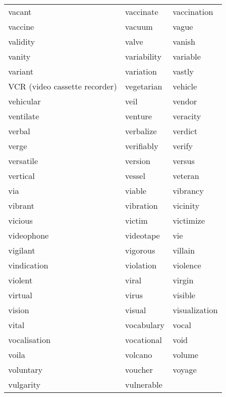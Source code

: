 \documentclass{minimal}
\begin{document}
\begin{longtable}{p{2.7cm}@{\hskip 0.2cm}p{2.7cm}@{\hskip 0.2cm}p{2.7cm}}
vacant & vaccinate & vaccination \\
vaccine & vacuum & vague \\
validity & valve & vanish \\
vanity & variability & variable \\
variant & variation & vastly \\
VCR (video cassette recorder) & vegetarian & vehicle \\
vehicular & veil & vendor \\
ventilate & venture & veracity \\
verbal & verbalize & verdict \\
verge & verifiably & verify \\
versatile & version & versus \\
vertical & vessel & veteran \\
via & viable & vibrancy \\
vibrant & vibration & vicinity \\
vicious & victim & victimize \\
videophone & videotape & vie \\
vigilant & vigorous & villain \\
vindication & violation & violence \\
violent & viral & virgin \\
virtual & virus & visible \\
vision & visual & visualization \\
vital & vocabulary & vocal \\
vocalisation & vocational & void \\
voila & volcano & volume \\
voluntary & voucher & voyage \\
vulgarity & vulnerable
\end{longtable}
\end{document}
